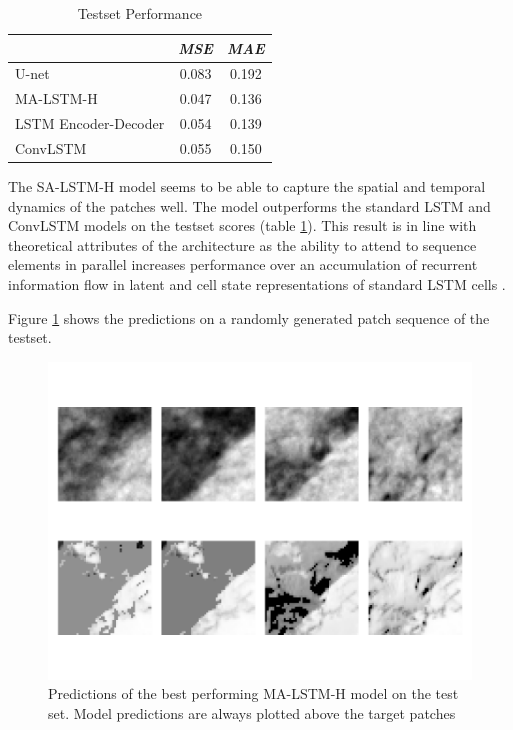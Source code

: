 \documentclass[12pt]{article}
\begin{document}
\begin{table}
	\caption{Testset Performance}
	\begin{tabular}{lcc}
		\toprule
		& \multicolumn{1}{c}{\textit{MSE}} & \multicolumn{1}{c}{\textit{MAE}} \\
		\midrule
		U-net & 0.083 & 0.192 \\
		MA-LSTM-H & 0.047 & 0.136 \\
		LSTM Encoder-Decoder & 0.054 & 0.139 \\
		ConvLSTM & 0.055 & 0.150 \\
		\bottomrule
	\end{tabular}%
	\label{tab:performance_estimations}%
\end{table}

The SA-LSTM-H model seems to be able to capture the spatial and temporal dynamics of the patches well. The model outperforms the standard LSTM and ConvLSTM models on the testset scores (table \ref{tab:performance_estimations}). This result is in line with theoretical attributes of the architecture as the ability to attend to sequence elements in parallel increases performance over an accumulation of recurrent information flow in latent and cell state representations of standard LSTM cells \citep{ali2021sea}. 

Figure \ref{fig:figure4} shows the predictions on a randomly generated patch sequence of the testset. 

\begin{figure}[H]
	
	\centering
	\includegraphics[scale = 0.9]{7.pdf}\hfill
	
	\caption{Predictions of the best performing MA-LSTM-H model on the test set. Model predictions are always plotted above the target patches}
	\label{fig:figure4}
	
\end{figure} 
\end{document}
